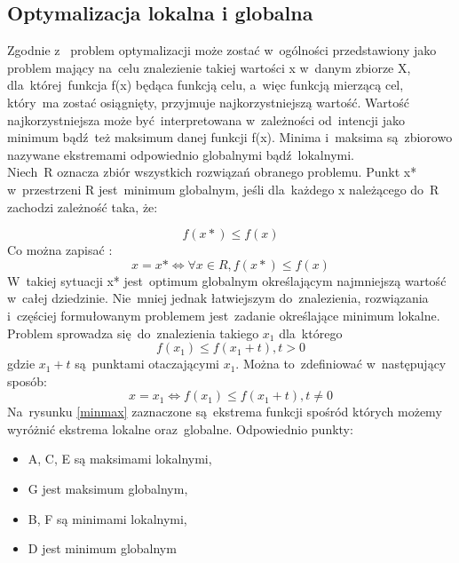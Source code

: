 \subsection{Optymalizacja lokalna i globalna}

Zgodnie z~\cite{michal} problem optymalizacji może zostać w~ogólności przedstawiony jako problem mający na~celu znalezienie takiej wartości x w~danym zbiorze X, dla~której~funkcja f(x) będąca funkcją celu, a~więc funkcją mierzącą cel, który~ma zostać osiągnięty, przyjmuje najkorzystniejszą wartość. Wartość najkorzystniejsza może być~interpretowana w~zależności od~intencji jako minimum bądź~też maksimum danej funkcji f(x). Minima i~maksima są~zbiorowo nazywane ekstremami odpowiednio globalnymi bądź~lokalnymi.\\

Niech~R oznacza zbiór wszystkich rozwiązań obranego problemu. Punkt x* w~przestrzeni R jest~minimum globalnym, jeśli dla~każdego x należącego do~R zachodzi zależność taka, że:


\begin{equation}
 f(x*) \le f(x)
\end{equation}
Co można zapisać :
\begin{equation}
x = x*   \Leftrightarrow   \forall x \in R,    f(x*)\le f(x)
\end{equation}
W~takiej sytuacji x* jest~optimum globalnym określającym najmniejszą wartość w~całej dziedzinie. Nie~mniej jednak łatwiejszym do~znalezienia, rozwiązania i~częściej formułowanym problemem jest~zadanie określające minimum lokalne. Problem sprowadza się~do~znalezienia takiego $x_{1} $ dla~którego~
\begin{equation}
f(x_{1}) \le f(x_{1} + t), t >0
\end{equation}
gdzie $x_{1} + t $ są~punktami otaczającymi $x_{1}$.
Można to~zdefiniować w~następujący sposób:
\begin{equation}
x = x_{1} \Leftrightarrow f(x_{1}) \le f(x_{1} + t), t \ne 0
\end{equation}
Na~rysunku \ref{minmax} zaznaczone są~ekstrema funkcji spośród których możemy wyróżnić ekstrema lokalne oraz~globalne. Odpowiednio punkty:\\

\begin{itemize}
\item A, C, E są maksimami lokalnymi,
\item G jest maksimum globalnym,
\item B, F są minimami lokalnymi,
\item D jest minimum globalnym
\end{itemize}

